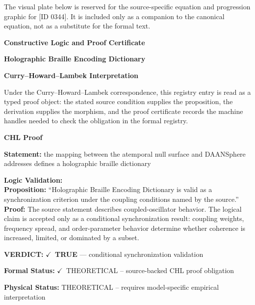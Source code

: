 \begingroup\footnotesize\sloppy
The visual plate below is reserved for the source-specific equation and progression graphic for [ID 0344]. It is included only as a companion to the canonical equation, not as a substitute for the formal text.
\par\endgroup
\ifTZPDarkEdition
{}
\fi

\clearpage
\begingroup\tzpsupportsetup
\noindent\textbf{\fontsize{10.8pt}{12.8pt}\selectfont [ID 0344] Constructive Logic and Proof Certificate}\par
\noindent\textbf{\fontsize{10pt}{12pt}\selectfont Holographic Braille Encoding Dictionary}\par
\vspace{0.45em}
\begingroup
\footnotesize
\setlength{\parskip}{0.22em}
\setlength{\parindent}{0pt}
\noindent\textbf{Curry--Howard--Lambek Interpretation}\par
Under the Curry--Howard--Lambek correspondence, this registry entry is read as a typed proof
object: the stated source condition supplies the proposition, the derivation supplies the
morphism, and the proof certificate records the machine handles needed to check the obligation
in the formal registry.

\vspace{0.45em}
\noindent\textbf{CHL Proof}\par
\textbf{Statement:} the mapping between the atemporal null surface and DAANSphere addresses defines a
holographic braille dictionary

\textbf{Logic Validation:}\\
\textbf{Proposition:} ``Holographic Braille Encoding Dictionary is valid as a synchronization criterion under
the coupling conditions named by the source.''\\
\textbf{Proof:} The source statement describes coupled-oscillator behavior. The logical claim is
accepted only as a conditional synchronization result: coupling weights, frequency
spread, and order-parameter behavior determine whether coherence is increased, limited,
or dominated by a subset.

\textbf{VERDICT:} \ensuremath{\checkmark}\ \textbf{TRUE} --- conditional synchronization validation

\textbf{Formal Status:} \ensuremath{\checkmark}\ THEORETICAL -- source-backed CHL proof obligation

\textbf{Physical Status:} THEORETICAL -- requires model-specific empirical interpretation
\par\vspace{0.45em}
\par
\ifTZPDarkEdition
{}
\fi
\endgroup
\endgroup
